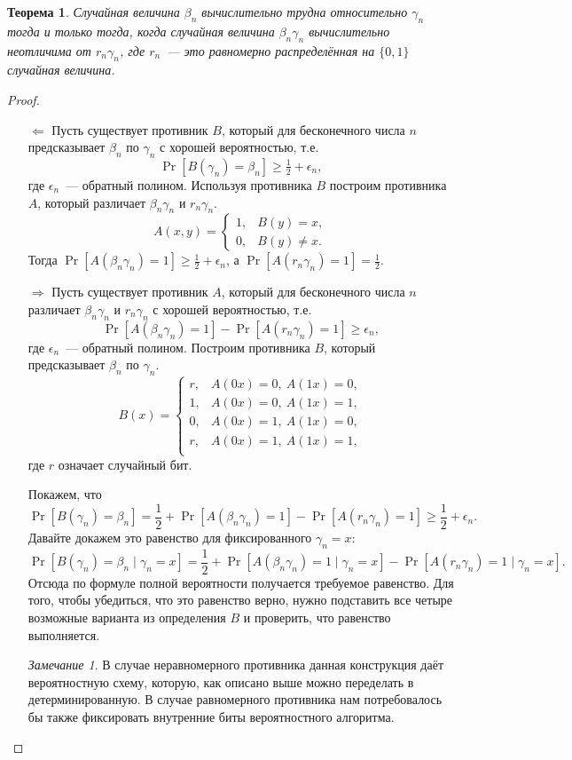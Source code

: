 \documentclass[12pt]{article}
\newcommand{\bits}{\{0,1\}}
\theoremstyle{definition}
\theoremstyle{plain}
\newtheorem{theorem}{Теорема}[section]
\theoremstyle{remark}
\newtheorem{remark}{Замечание}[section]
\begin{document}
\begin{theorem}\label{thm:hard-random-value}
Случайная величина $\beta_n$ вычислительно трудна относительно $\gamma_n$ тогда и только тогда,
когда случайная величина $\beta_n\gamma_n$ вычислительно неотличима от $r_n\gamma_n$, 
где $r_n$~--- это равномерно распределённая на $\bits$ случайная величина.
\end{theorem}
\begin{proof}\mbox{}
\begin{itemize}
\item[$\Leftarrow$] Пусть существует противник $B$, который для бесконечного числа $n$
предсказывает $\beta_n$ по $\gamma_n$ с хорошей вероятностью, т.е.
$$\Pr[B(\gamma_n) = \beta_n]\ge \tfrac12 + \epsilon_n,$$
где $\epsilon_n$~--- обратный полином.
Используя противника $B$ построим противника $A$, который различает $\beta_n\gamma_n$ и $r_n\gamma_n$.
$$A(x,y) = 
\begin{cases}
1, & B(y) = x,\\
0, & B(y) \neq x.
\end{cases}
$$
Тогда $\Pr[A(\beta_n\gamma_n) = 1]\ge\frac12 + \epsilon_n$, а $\Pr[A(r_n\gamma_n) = 1] = \frac12$.

\item[$\Rightarrow$] Пусть существует противник $A$, который для бесконечного числа $n$ 
различает $\beta_n\gamma_n$ и $r_n\gamma_n$ с хорошей вероятностью, т.е.
$$\Pr[A(\beta_n\gamma_n) = 1] - \Pr[A(r_n\gamma_n) = 1]\ge\epsilon_n,$$
где $\epsilon_n$~--- обратный полином.  Построим противника $B$, который предсказывает $\beta_n$ по $\gamma_n$.
$$B(x) = 
\begin{cases}
r, & A(0x) = 0,\ A(1x) = 0,\\
1, & A(0x) = 0,\ A(1x) = 1,\\
0, & A(0x) = 1,\ A(1x) = 0,\\
r, & A(0x) = 1,\ A(1x) = 1,\\
\end{cases}
$$
где $r$ означает случайный бит.

Покажем, что 
$$\Pr[B(\gamma_n) = \beta_n] = \frac12 + \Pr[A(\beta_n\gamma_n) = 1] - \Pr[A(r_n\gamma_n) = 1] \ge \frac12 + \epsilon_n.$$
Давайте докажем это равенство для фиксированного $\gamma_n = x$:
$$\Pr[B(\gamma_n) = \beta_n\mid \gamma_n = x] = 
  \frac12 + \Pr[A(\beta_n\gamma_n) = 1\mid \gamma_n = x] - \Pr[A(r_n\gamma_n) = 1\mid \gamma_n = x].$$
Отсюда по формуле полной вероятности получается требуемое равенство. Для того, чтобы убедиться,
что это равенство верно, нужно подставить все четыре возможные варианта из определения $B$
и проверить, что равенство выполняется.

\begin{remark}
В случае неравномерного противника данная конструкция даёт вероятностную схему, 
которую, как описано выше можно переделать в детерминированную. В случае равномерного
противника нам потребовалось бы также фиксировать внутренние биты вероятностного алгоритма.
\end{remark}
\end{itemize}
\end{proof}
\end{document}

